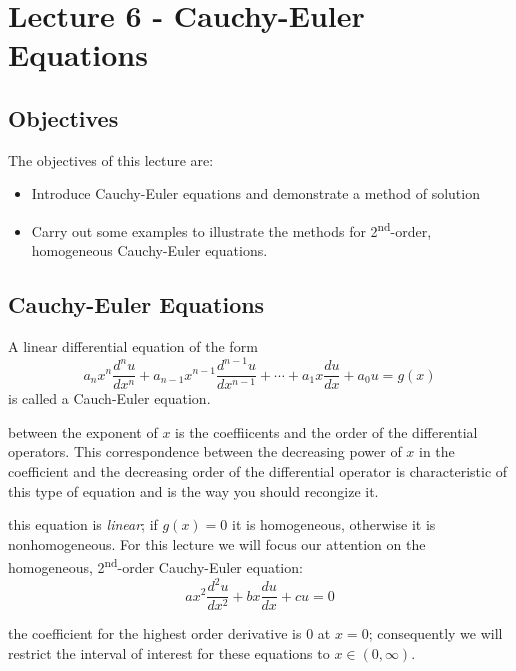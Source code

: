 \chapter{Lecture 6 - Cauchy-Euler Equations}
\label{ch:lec6}
\section{Objectives}
The objectives of this lecture are:
\begin{itemize}
\item Introduce Cauchy-Euler equations and demonstrate a method of solution
\item Carry out some examples to illustrate the methods for 2\textsuperscript{nd}-order, homogeneous Cauchy-Euler equations.
\end{itemize}

\section{Cauchy-Euler Equations}

A linear differential equation of the form
\begin{equation}
a_nx^n\frac{d^n u}{dx^n}+a_{n-1}x^{n-1}\frac{d^{n-1}u}{dx^{n-1}}+\cdots+a_1x\frac{du}{dx}+a_0u=g(x)
\label{eq:cauchy-euler-eqn}
\end{equation}
is called a Cauch-Euler equation.

 between the exponent of $x$ is the coeffiicents and the order of the differential operators.  This correspondence between the decreasing power of $x$ in the coefficient and the decreasing order of the differential operator is characteristic of this type of equation and is the way you should recongize it. 

 this equation is \emph{linear}; if $g(x)=0$ it is homogeneous, otherwise it is nonhomogeneous.  For this lecture we will focus our attention on the homogeneous, 2\textsuperscript{nd}-order Cauchy-Euler equation:
\begin{equation}
ax^2\frac{d^2u}{dx^2}+bx\frac{du}{dx}+cu=0
\end{equation}

 the coefficient for the highest order derivative is 0 at $x=0$; consequently we will restrict the interval of interest for these equations to $x \in \left(0,\infty\right)$.

